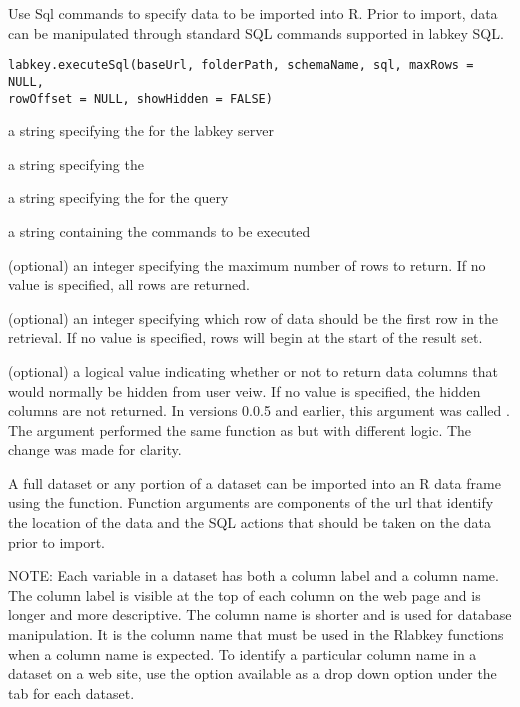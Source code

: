 \documentclass{book}
\begin{document}
\begin{Description}\relax
Use Sql commands to specify data to be imported into R. Prior to import, data can
be manipulated through standard SQL commands supported in labkey SQL.
\end{Description}
\begin{Usage}
\begin{verbatim}
labkey.executeSql(baseUrl, folderPath, schemaName, sql, maxRows = NULL, 
rowOffset = NULL, showHidden = FALSE)
\end{verbatim}
\end{Usage}
\begin{Arguments}
\begin{ldescription}
\item[\code{baseUrl}] a string specifying the for the labkey server
\item[\code{folderPath}] a string specifying the  
\item[\code{schemaName}] a string specifying the   for the query
\item[\code{sql}] a string containing the  commands to be executed
\item[\code{maxRows}] (optional) an integer specifying the maximum number of rows to return. If no value is specified, all rows are returned.
\item[\code{rowOffset}] (optional) an integer specifying which row of data should be the first row in the retrieval. 
If no value is specified, rows will begin at the start of the result set.
\item[\code{showHidden}] (optional) a logical value indicating whether or not to return data columns that would 
normally be hidden from user veiw. If no value is specified, the hidden columns are not returned. 
In versions 0.0.5 and earlier, this argument was called . The  argument performed the same function as  but with different logic. The change was made for clarity.
\end{ldescription}
\end{Arguments}
\begin{Details}\relax
A full dataset or any portion of a dataset can be imported into an R
data frame using the 
function. Function arguments are components of the url that identify the location of the
data and the SQL actions that should be taken on the data prior to import.


NOTE: Each variable in a dataset has both a column label and a column name. The column label is visible at the top
of each column on the web page and is longer and more descriptive. The column name is shorter and is
used  for database manipulation. It is the column name that must be used in
the Rlabkey functions when a column name is expected. To identify a particular column name in a dataset on
a web site, use the  option available as a drop down option under the 
tab for each dataset.
\end{Details}
\end{document}

